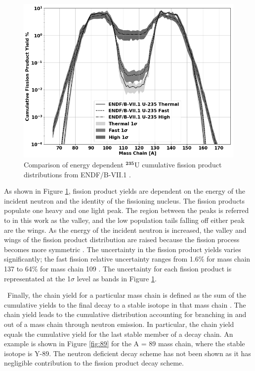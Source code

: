 \begin{figure}[htb!]
	\includegraphics[width=\linewidth]{Figures/Chapter2/ENDF_FPs.png}
	\caption[Comparison of energy dependent${^{235}}$U cumulative fission product distributions]{Comparison of energy dependent $\mathbf{^{235}}$U cumulative fission product distributions from ENDF/B-VII.1 \cite{ENDF}.}
	\label{fig:U235Cumulative}	
\end{figure}

As shown in Figure \ref{fig:U235Cumulative}, fission product yields are dependent on the energy of the incident neutron and the identity of the fissioning nucleus. 
The fission products populate one heavy and one light peak. 
The region between the peaks is referred to in this work as the valley, and the low population tails falling off either peak are the wings. 
As the energy of the incident neutron is increased, the valley and wings of the fission product distribution are raised because the fission process becomes more symmetric \cite{Tonchev0}. 
The uncertainty in the fission product yields varies significantly; the fast fission relative uncertainty ranges from 1.6\% for mass chain 137 to 64\% for mass chain 109 \cite{ENDF}. The uncertainty for each fission product is representated at the 1$\sigma$ level as bands in Figure \ref{fig:U235Cumulative}.

\ Finally, the chain yield for a particular mass chain is defined as the sum of the cumulative yields to the final decay to a stable isotope in that mass chain \cite{Nichols2008}. 
The chain yield leads to the cumulative distribution accounting for branching in and out of a mass chain through neutron emission.
In particular, the chain yield equals the cumulative yield for the last stable member of a decay chain.  
An example is shown in Figure \ref{fig:89} for the A = 89 mass chain, where the stable isotope is Y-89\cite{SINGH20131}. 
The neutron deficient decay scheme has not been shown as it has negligible contribution to the fission product decay scheme. 

